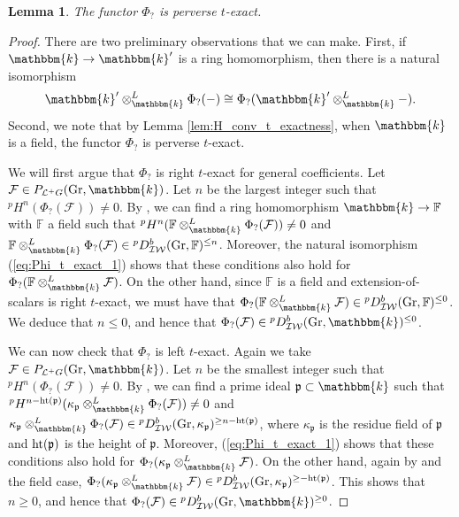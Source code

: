 \documentclass{amsart}
\newcommand{\F}{\mathbb{F}}
\renewcommand{\L}{\mathcal{L}}
\renewcommand{\k}{\mathbbm{k}}
\newcommand{\scrF}{\mathcal{F}}
\newcommand{\IW}{\mathcal{IW}}
\DeclareMathOperator{\Gr}{Gr}
\newcommand{\fr}[1]{\mathfrak{#1}}
\newtheorem{lemma}[subsubsection]{Lemma}
\theoremstyle{definition}
\begin{document}
    \begin{lemma}\label{lem:Phi_t_exact}
        The functor $\Phi_?$ is perverse $t$-exact.
    \end{lemma}
    \begin{proof}
        There are two preliminary observations that we can make. First, if $\k \to \k'$ is a ring homomorphism, then there is a natural isomorphism
        \begin{equation}\label{eq:Phi_t_exact_1}
            \k' \otimes_{\k}^L \Phi_? (-) \cong \Phi_? (\k' \otimes_{\k}^L -).
        \end{equation}
        Second, we note that by Lemma \ref{lem:H_conv_t_exactness}, when $\k$ is a field, the functor $\Phi_?$ is perverse $t$-exact.

        We will first argue that $\Phi_?$ is right $t$-exact for general coefficients. Let $\scrF \in P_{\L^+G} (\Gr, \k)$.
        Let $n$ be the largest integer such that ${}^p H^n (\Phi_? (\scrF)) \neq 0$.
        By \cite[Lemma 3.2.6]{Ac}, we can find a ring homomorphism $\k \to \F$ with $\F$ a field such that ${}^p H^n (\F \otimes_{\k}^L \Phi_? (\scrF)) \neq 0$ and $\F \otimes_{\k}^L  \Phi_? (\scrF) \in {}^p D_{\IW}^b (\Gr, \F)^{\leq n}$.
        Moreover, the natural isomorphism (\ref{eq:Phi_t_exact_1}) shows that these conditions also hold for $\Phi_? (\F \otimes_{\k}^L \scrF)$.
        On the other hand, since $\F$ is a field and extension-of-scalars is right $t$-exact, we must have that $\Phi_? (\F \otimes_{\k}^L \scrF) \in {}^p D_{\IW}^b (\Gr, \F)^{\leq 0}$. We deduce that $n \leq 0$, and hence that $\Phi_? (\scrF) \in {}^p D_{\IW}^b (\Gr, \k)^{\leq 0}$. 

        We can now check that $\Phi_?$ is left $t$-exact. Again we take $\scrF \in P_{\L^+G} (\Gr, \k)$.
        Let $n$ be the smallest integer such that ${}^p H^n (\Phi_? (\scrF)) \neq 0$.
        By \cite[Lemma 3.2.7]{Ac}, we can find a prime ideal $\fr{p} \subset \k$ such that ${}^p H^{n - \textnormal{ht} (\fr{p})} (\kappa_{\fr{p}} \otimes_{\k}^L \Phi_? (\scrF)) \neq 0$ and $\kappa_{\fr{p}} \otimes_{\k}^L  \Phi_? (\scrF) \in {}^p D_{\IW}^b (\Gr, \kappa_{\fr{p}})^{\geq n - \textnormal{ht} (\fr{p})}$, where $\kappa_{\fr{p}}$ is the residue field of $\fr{p}$ and $\textnormal{ht} (\fr{p})$ is the height of $\fr{p}$.
        Moreover, (\ref{eq:Phi_t_exact_1}) shows that these conditions also hold for $\Phi_? (\kappa_{\fr{p}} \otimes_{\k}^L \scrF)$.
        On the other hand, again by \cite[Lemma 3.2.7]{Ac} and the field case, $\Phi_? (\kappa_{\fr{p}} \otimes_{\k}^L \scrF) \in {}^p D_{\IW}^b (\Gr, \kappa_{\fr{p}})^{\geq - \textnormal{ht} (\fr{p})}$.
        This shows that $n \geq 0$, and hence that $\Phi_? (\scrF) \in {}^p D_{\IW}^b (\Gr, \k)^{\geq 0}$.
    \end{proof}
\end{document}
